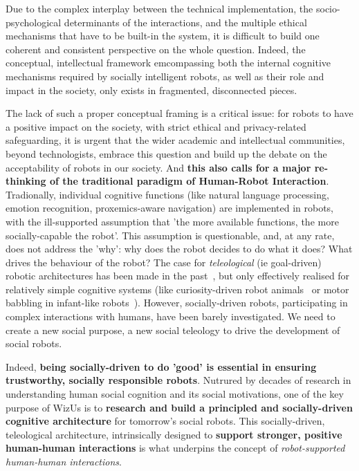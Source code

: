\documentclass[11pt]{report}
\newcommand{\project}{WizUs\xspace}
\begin{document}
Due to the complex interplay between the technical implementation, the
socio-psychological determinants of the interactions, and the multiple ethical
mechanisms that have to be built-in the system, it is difficult to build one
coherent and consistent perspective on the whole question. Indeed, the
conceptual, intellectual framework emcompassing both the internal cognitive
mechanisms required by socially intelligent robots, as well as their role and
impact in the society, only exists in fragmented, disconnected pieces.


The lack of such a proper conceptual framing is a critical issue: for robots to
have a positive impact on the society, with strict ethical and privacy-related
safeguarding, it is urgent that the wider academic and intellectual communities,
beyond technologists, embrace this question and build up the debate on the
acceptability of robots in our society. And \textbf{this also calls for a major
re-thinking of the traditional paradigm of Human-Robot Interaction}.
Tradionally, individual cognitive functions (like natural language processing,
emotion recognition, proxemics-aware navigation) are implemented in robots, with
the ill-supported assumption that 'the more available functions, the more
socially-capable the robot'. This assumption is questionable, and, at any rate,
does not address the 'why': why does the robot decides to do what it does? What
drives the behaviour of the robot? The case for \emph{teleological} (ie
goal-driven) robotic architectures has been made in the
past~\cite{wrede2012towards}, but only effectively realised for relatively
simple cognitive systems (like curiosity-driven robot
animals~\cite{oudeyer2005playground} or motor babbling in infant-like
robots~\cite{forestier2017unified}). However, socially-driven robots,
participating in complex interactions with humans, have been barely
investigated. We need to create a new social purpose, a new social teleology to
drive the development of social robots.

Indeed, \textbf{being socially-driven to do 'good' is essential in ensuring
trustworthy, socially responsible robots}. Nutrured by decades of research in
understanding human social cognition and its social motivations, one of the key
purpose of \project is to \textbf{research and build a principled and
socially-driven cognitive architecture} for tomorrow's social robots. This
socially-driven, teleological architecture, intrinsically designed to
\textbf{support stronger, positive human-human interactions} is what underpins
the concept of \emph{robot-supported human-human interactions}.
\end{document}
